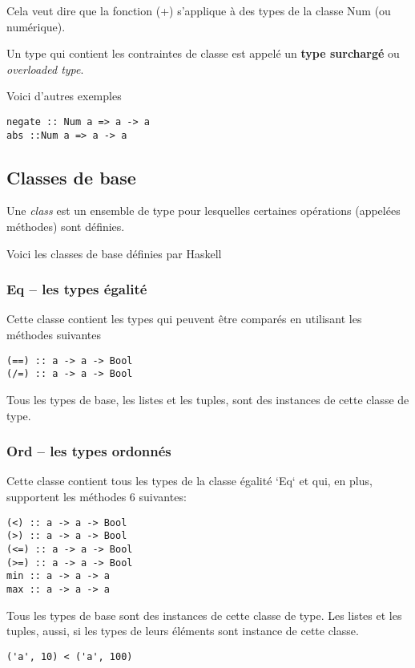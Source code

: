 \documentclass[11pt]{article}
\begin{document}
Cela veut dire que la fonction (+) s'applique à des types de la classe Num (ou numérique).

Un type qui contient les contraintes de classe est appelé un \textbf{type surchargé} ou \emph{overloaded type}.

Voici d'autres exemples
\begin{verbatim}
negate :: Num a => a -> a
abs ::Num a => a -> a
\end{verbatim}

\subsection{Classes de base}
\label{sec:orgc8fa39a}
Une \emph{class} est un ensemble de type pour lesquelles certaines opérations (appelées méthodes) sont définies.

Voici les classes de base définies par Haskell

\subsubsection{Eq -- les types égalité}
\label{sec:org6e9026f}
Cette classe contient les types qui peuvent être comparés  en utilisant les méthodes suivantes

\begin{verbatim}
(==) :: a -> a -> Bool
(/=) :: a -> a -> Bool
\end{verbatim}


Tous les types de base, les listes et les tuples, sont des instances de cette classe de type.

\subsubsection{Ord --  les types  ordonnés}
\label{sec:org62736c3}
Cette classe contient tous les types de la classe égalité `Eq` et qui, en plus, supportent les méthodes 6 suivantes:

\begin{verbatim}
(<) :: a -> a -> Bool
(>) :: a -> a -> Bool
(<=) :: a -> a -> Bool
(>=) :: a -> a -> Bool
min :: a -> a -> a
max :: a -> a -> a
\end{verbatim}


Tous les types de base sont des instances de cette classe de type.   Les listes et les tuples, aussi, si les types de leurs éléments  sont instance de cette classe.

\begin{verbatim}
('a', 10) < ('a', 100)
\end{verbatim}
\end{document}

